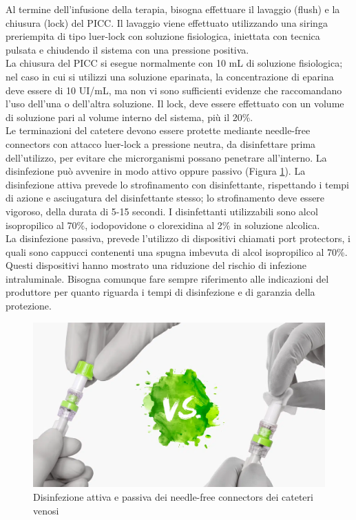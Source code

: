 Al termine dell’infusione della terapia, bisogna effettuare il lavaggio (flush) e la chiusura (lock) del PICC.
Il lavaggio viene effettuato utilizzando una siringa preriempita di tipo luer-lock con soluzione fisiologica, 
iniettata con tecnica pulsata e chiudendo il sistema con una pressione positiva.\\ La chiusura del PICC si esegue 
normalmente con 10 mL di soluzione fisiologica; nel caso in cui si utilizzi una soluzione eparinata, la 
concentrazione di eparina deve essere di 10 UI/mL, ma non vi sono sufficienti evidenze che raccomandano l’uso 
dell’una o dell’altra soluzione. 
Il lock, deve essere effettuato con un volume di soluzione pari al volume interno del sistema, più il 20\%.\\
Le terminazioni del catetere devono essere protette mediante needle-free connectors con attacco luer-lock a pressione 
neutra, da disinfettare prima dell’utilizzo, per evitare che microrganismi possano penetrare 
all’interno. La disinfezione può avvenire in modo attivo oppure passivo (Figura \ref{fig:FIGURE_4.11}). 
La disinfezione attiva prevede lo strofinamento con disinfettante, rispettando i tempi di azione e asciugatura del 
disinfettante stesso; lo strofinamento deve essere vigoroso, della durata di 5-15 secondi. I disinfettanti 
utilizzabili sono alcol isopropilico al 70\%, iodopovidone o clorexidina al 2\% in soluzione alcolica\cite{AIOMCVC}.\\
La disinfezione passiva, prevede l’utilizzo di dispositivi chiamati port protectors, 
i quali sono cappucci contenenti una spugna imbevuta di alcol isopropilico al 70\%. 
Questi dispositivi hanno mostrato una riduzione del rischio di 
infezione intraluminale. Bisogna comunque fare sempre riferimento alle indicazioni del produttore per quanto 
riguarda i tempi di disinfezione e di garanzia della protezione\cite{AIOMCVC}.

\begin{figure}[H]
    \begin{center}
    \includegraphics[width=0.4\columnwidth]{img/converted.png}
    \vspace{-3mm}
    \end{center}
    \caption{Disinfezione attiva e passiva dei needle-free connectors dei cateteri venosi
    \cite{img47BIS}}
    \label{fig:FIGURE_4.11}
\end{figure}

